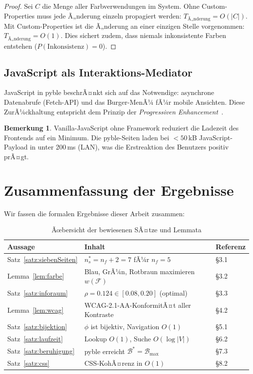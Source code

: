 ﻿\documentclass[a4paper,12pt]{article}
\theoremstyle{definition}
\newtheorem{bemerkung}{Bemerkung}
\begin{document}
\begin{proof}
    Sei $C$ die Menge aller Farbverwendungen im System. Ohne Custom-Properties
    muss jede Ã„nderung einzeln propagiert werden: $T_{\text{Ã„nderung}} = O(|C|)$.
    Mit Custom-Properties ist die Ã„nderung an einer einzigen Stelle vorgenommen:
    $T_{\text{Ã„nderung}} = O(1)$. Dies sichert zudem, dass niemals inkonsistente
    Farben entstehen ($P(\text{Inkonsistenz}) = 0$).
\end{proof}

\subsection{JavaScript als Interaktions-Mediator}

JavaScript in pyble beschrÃ¤nkt sich auf das Notwendige: asynchrone Datenabrufe
(Fetch-API) und das Burger-MenÃ¼ fÃ¼r mobile Ansichten. Diese ZurÃ¼ckhaltung
entspricht dem Prinzip der \emph{Progressiven Enhancement}~\cite{gustafson2011}.

\begin{bemerkung}
    Vanilla-JavaScript ohne Framework reduziert die Ladezeit des Frontends
    auf ein Minimum. Die pyble-Seiten laden bei $< 50$\,kB JavaScript-Payload
    in unter 200\,ms (LAN), was die Erstreaktion des Benutzers positiv prÃ¤gt.
\end{bemerkung}

\section{Zusammenfassung der Ergebnisse}

Wir fassen die formalen Ergebnisse dieser Arbeit zusammen:

\begin{table}[h]
\centering
\caption{Ãœbersicht der bewiesenen SÃ¤tze und Lemmata}
\label{tab:zusammenfassung}
\begin{tabular}{lp{7cm}l}
\toprule
\textbf{Aussage} & \textbf{Inhalt} & \textbf{Referenz} \\
\midrule
Satz~\ref{satz:siebenSeiten} & $n_s^* = n_f + 2 = 7$ fÃ¼r $n_f = 5$ & \S3.1 \\
Lemma~\ref{lem:farbe}        & Blau, GrÃ¼n, Rotbraun maximieren $w(\mathcal{F})$ & \S3.2 \\
Satz~\ref{satz:inforaum}     & $\rho = 0.124 \in [0.08, 0.20]$ (optimal) & \S3.3 \\
Lemma~\ref{lem:wcag}         & WCAG-2.1-AA-KonformitÃ¤t aller Kontraste & \S4.2 \\
Satz~\ref{satz:bijektion}    & $\phi$ ist bijektiv, Navigation $O(1)$ & \S5.1 \\
Satz~\ref{satz:laufzeit}     & Lookup $O(1)$, Suche $O(\log |V|)$ & \S6.2 \\
Satz~\ref{satz:beruhigung}   & pyble erreicht $\mathcal{B}^* = \mathcal{B}_{\max}$ & \S7.3 \\
Satz~\ref{satz:css}          & CSS-KohÃ¤renz in $O(1)$ & \S8.2 \\
\bottomrule
\end{tabular}
\end{table}
\end{document}
